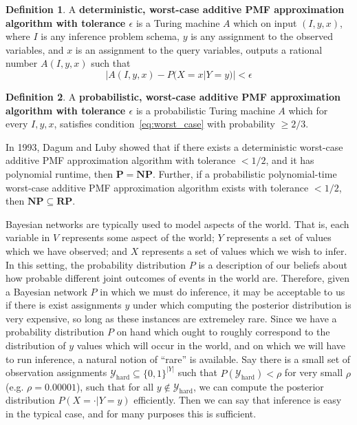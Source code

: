 \documentclass{article}
\renewcommand{\P}{\mathbf{P}}
\newcommand{\NP}{\mathbf{NP}}
\newcommand{\RP}{\mathbf{RP}}
\theoremstyle{definition}
\newtheorem{defn}{Definition}
\theoremstyle{remark}
\begin{document}
\begin{defn}
A \textbf{deterministic, worst-case additive PMF approximation algorithm with tolerance $\epsilon$} is a Turing machine $A$ which on input
$(I, y, x)$, where $I$ is any inference problem schema, $y$ is any assignment to the observed variables, and $x$ is an assignment to the query variables, outputs a rational number $A(I, y, x)$ such that
\begin{equation} \label{eq:worst_case}
|A(I, y, x) - P(X = x | Y = y)| < \epsilon
\end{equation}
\end{defn}
\begin{defn}
A \textbf{probabilistic, worst-case additive PMF approximation algorithm with tolerance $\epsilon$} is a probabilistic Turing machine $A$ which for every $I, y, x$, satisfies condition~\ref{eq:worst_case} with probability $\geq 2/3$.
\end{defn}

In 1993, Dagum and Luby \cite{dagum1993} showed that if there exists a deterministic worst-case additive PMF approximation algorithm with tolerance $< 1/2$, and it has polynomial runtime, then $\P = \NP$.
Further, if a probabilistic polynomial-time worst-case additive PMF approximation algorithm exists with tolerance $< 1/2$, then $\NP \subseteq \RP$.

Bayesian networks are typically used to model aspects of the world.
That is, each variable in $V$ represents some aspect of the world; $Y$ represents a set of values which we have observed; and $X$ represents a set of values which we wish to infer.
In this setting, the probability distribution $P$ is a description of our beliefs about how probable different joint outcomes of events in the world are.
Therefore, given a Bayesian network $P$ in which we must do inference, it may be acceptable to us if there is exist assignments $y$ under which computing the posterior distribution is very expensive, so long as these instances are extremeley rare.
Since we have a probability distribution $P$ on hand which ought to roughly correspond to the distribution of $y$ values which will occur in the world, and on which we will have to run inference, a natural notion of ``rare'' is available.
Say there is a small set of observation assignments $\mathcal{Y}_\text{hard} \subseteq \{0, 1\}^{|Y|}$ such that $P(\mathcal{Y}_\text{hard}) < \rho$ for very small $\rho$ (e.g. $\rho = 0.00001$), such that for all $y \notin \mathcal{Y}_\text{hard}$, we can compute the posterior distribution $P(X = \cdot | Y = y)$ efficiently.
Then we can say that inference is easy in the typical case, and for many purposes this is sufficient.
\end{document}
